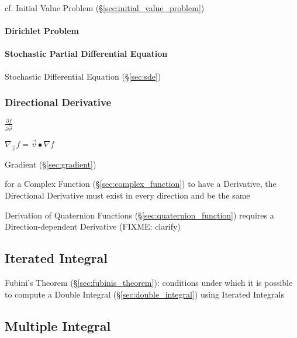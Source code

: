 \fist cf. Initial Value Problem (\S\ref{sec:initial_value_problem})



\paragraph{Dirichlet Problem}\label{sec:dirichlet_problem}\hfill

\paragraph{Stochastic Partial Differential Equation}\label{sec:spde}\hfill

\fist Stochastic Differential Equation (\S\ref{sec:sde})



\subsubsection{Directional Derivative}\label{sec:directional_derivative}

$\frac{\partial{f}}{\partial{\vec{v}}}$

$\nabla_{\vec{v}} f = \vec{v}\bullet \nabla{f}$

Gradient (\S\ref{sec:gradient})

for a Complex Function (\S\ref{sec:complex_function}) to have a Derivative, the
Directional Derivative must exist in every direction and be the same

Derivation of Quaternion Functions (\S\ref{sec:quaternion_function}) requires a
Direction-dependent Derivative (FIXME: clarify)



\subsection{Iterated Integral}\label{sec:iterated_integral}

\fist Fubini's Theorem (\S\ref{sec:fubinis_theorem}): conditions under which it
is possible to compute a Double Integral (\S\ref{sec:double_integral}) using
Iterated Integrals



\subsection{Multiple Integral}\label{sec:multiple_integral}

